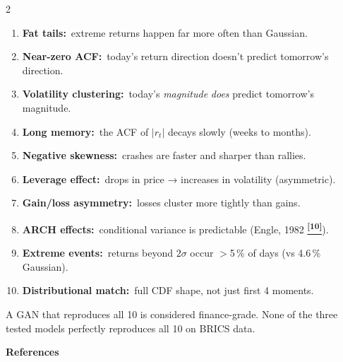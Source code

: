 \documentclass[10pt]{article}
\newcommand{\indigobox}[2]{\begin{tcolorbox}[mybox={Indigo}{IBg},title={#1}]#2\end{tcolorbox}}
\newcommand{\tcite}[1]{%
  \hyperlink{R:#1}{\textsuperscript{\scriptsize\textbf{[#1]}}}}
\begin{document}
\begin{multicols}{2}
\indigobox{The 10 Stylized Facts in Plain Language}{%
\begin{enumerate}[leftmargin=12pt]
  \item \textbf{Fat tails:}\ extreme returns happen far more often than Gaussian.
  \item \textbf{Near-zero ACF:}\ today's return direction doesn't predict tomorrow's direction.
  \item \textbf{Volatility clustering:}\ today's \emph{magnitude} \emph{does} predict tomorrow's magnitude.
  \item \textbf{Long memory:}\ the ACF of $|r_t|$ decays slowly (weeks to months).
  \item \textbf{Negative skewness:}\ crashes are faster and sharper than rallies.
  \item \textbf{Leverage effect:}\ drops in price → increases in volatility (asymmetric).
  \item \textbf{Gain/loss asymmetry:}\ losses cluster more tightly than gains.
  \item \textbf{ARCH effects:}\ conditional variance is predictable (Engle, 1982\tcite{10}).
  \item \textbf{Extreme events:}\ returns beyond $2\sigma$ occur $>$5\,\% of days (vs 4.6\,\% Gaussian).
  \item \textbf{Distributional match:}\ full CDF shape, not just first 4 moments.
\end{enumerate}
A GAN that reproduces all 10 is considered finance-grade. None of the three tested models perfectly reproduces all 10 on BRICS data.}

\end{multicols}



\clearpage
{}

\begin{tcolorbox}[
  colback=NavyBg, colframe=NavyBg!60!black, arc=4pt,
  left=8pt, right=8pt, top=4pt, bottom=4pt,
  before skip=0pt, after skip=10pt]
{\large\bfseries\color{Navy} References}
\end{tcolorbox}
\end{document}
